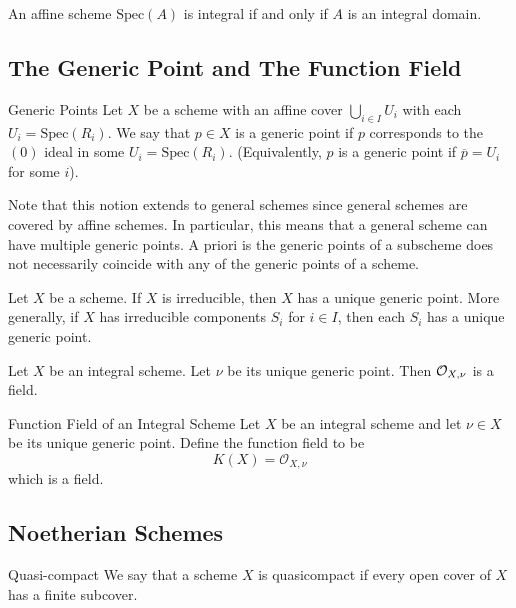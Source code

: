 \documentclass[a4paper]{article}
\begin{document}
\begin{prp}{}{} An affine scheme $\text{Spec}(A)$ is integral if and only if $A$ is an integral domain. 
\end{prp}

\subsection{The Generic Point and The Function Field}
\begin{defn}{Generic Points}{} Let $X$ be a scheme with an affine cover $\bigcup_{i\in I}U_i$ with each $U_i=\text{Spec}(R_i)$. We say that $p\in X$ is a generic point if $p$ corresponds to the $(0)$ ideal in some $U_i=\text{Spec}(R_i)$. (Equivalently, $p$ is a generic point if $\overline{p}=U_i$ for some $i$). 
\end{defn}

Note that this notion extends to general schemes since general schemes are covered by affine schemes. In particular, this means that a general scheme can have multiple generic points. A priori is the generic points of a subscheme does not necessarily coincide with any of the generic points of a scheme. 

\begin{prp}{}{} Let $X$ be a scheme. If $X$ is irreducible, then $X$ has a unique generic point. More generally, if $X$ has irreducible components $S_i$ for $i\in I$, then each $S_i$ has a unique generic point. 
\end{prp}

\begin{prp}{}{} Let $X$ be an integral scheme. Let $\nu$ be its unique generic point. Then $\mathcal{O}_{X,\nu}$ is a field. 
\end{prp}

\begin{defn}{Function Field of an Integral Scheme}{} Let $X$ be an integral scheme and let $\nu\in X$ be its unique generic point. Define the function field to be $$K(X)=\mathcal{O}_{X,\nu}$$ which is a field. 
\end{defn}

\subsection{Noetherian Schemes}
\begin{defn}{Quasi-compact}{} We say that a scheme $X$ is quasicompact if every open cover of $X$ has a finite subcover. 
\end{defn}
\end{document}
